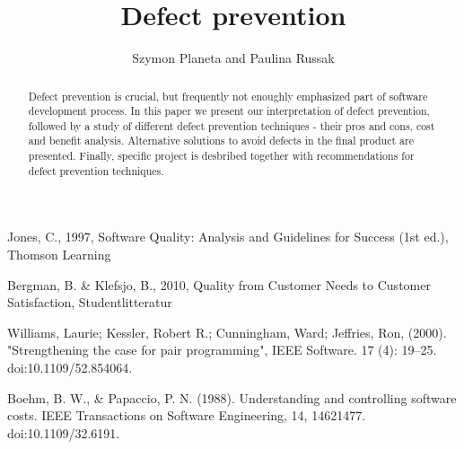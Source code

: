 \documentclass[letterpaper, 10 pt, conference]{ieeeconf}  %
\title{\LARGE \bf
Defect prevention}
\author{Szymon Planeta and Paulina Russak%
}
\begin{document}
\maketitle
\thispagestyle{empty}
\pagestyle{empty}


\begin{abstract}

	Defect prevention is crucial, but frequently not enoughly emphasized part of software development process. In this paper we present our interpretation of defect prevention, followed by a study of different defect prevention techniques - their pros and cons, cost and benefit analysis. Alternative solutions to avoid defects in the final product are presented. Finally, specific project is desbribed together with recommendations for defect prevention techniques.

\end{abstract}








\begin{thebibliography}{99}

 Jones, C., 1997, Software Quality: Analysis and Guidelines for Success (1st ed.), Thomson Learning

 Bergman, B. \& Klefsjo, B., 2010, Quality from Customer Needs to Customer Satisfaction, Studentlitteratur

  Williams, Laurie; Kessler, Robert R.; Cunningham, Ward; Jeffries, Ron, (2000). "Strengthening the case for pair programming", IEEE Software. 17 (4): 19–25. doi:10.1109/52.854064.

 Boehm, B. W., \& Papaccio, P. N. (1988). Understanding and controlling software costs. IEEE Transactions on Software Engineering, 14, 14621477. doi:10.1109/32.6191.
 







\end{thebibliography}
\end{document}
